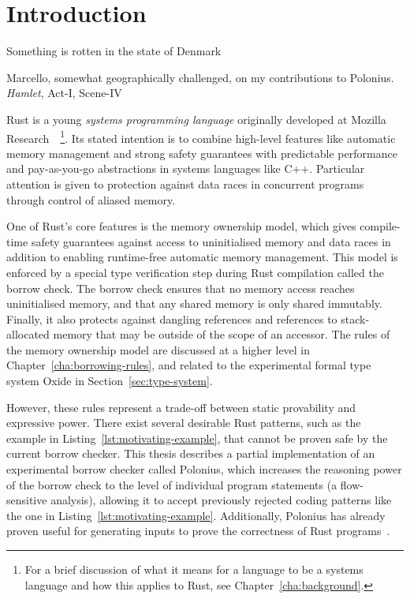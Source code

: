 \documentclass[11pt,a4paper,twoside,openany,draft]{report}
\begin{document}
\chapter{Introduction}
\epigraph{Something is rotten in the state of Denmark}%
{Marcello, somewhat geographically challenged, on my contributions to Polonius.
  \textit{Hamlet}, Act-I, Scene-IV}
Rust is a young \textit{systems programming language} originally developed at
Mozilla Research~\cite{matsakis_rust_2014}~\footnote{For a brief discussion of
  what it means for a language to be a systems language and how this applies to
  Rust, see Chapter~\ref{cha:background}.}. Its stated intention is to combine
high-level features like automatic memory management and strong safety
guarantees with predictable performance and pay-as-you-go abstractions in
systems languages like C++. Particular attention is given to protection against
data races in concurrent programs through control of aliased memory.

One of Rust's core features is the memory ownership model, which gives
compile-time safety guarantees against access to uninitialised memory and data
races in addition to enabling runtime-free automatic memory management. This
model is enforced by a special type verification step during Rust compilation
called the borrow check. The borrow check ensures that no memory access reaches
uninitialised memory, and that any shared memory is only shared immutably.
Finally, it also protects against dangling references and references to
stack-allocated memory that may be outside of the scope of an accessor. The
rules of the memory ownership model are discussed at a higher level in
Chapter~\ref{cha:borrowing-rules}, and related to the experimental formal type
system Oxide in Section~\ref{sec:type-system}.

However, these rules represent a trade-off between static provability and
expressive power. There exist several desirable Rust patterns, such as the
example in Listing~\ref{lst:motivating-example}, that cannot be proven safe by
the current borrow checker. This thesis describes a partial implementation of an
experimental borrow checker called Polonius, which increases the reasoning power
of the borrow check to the level of individual program statements (a
flow-sensitive analysis), allowing it to accept previously rejected coding
patterns like the one in Listing~\ref{lst:motivating-example}. Additionally,
Polonius has already proven useful for generating inputs to prove the
correctness of Rust programs~\cite{Astrauskas:2019:LRT:3366395.3360573}.
\end{document}
